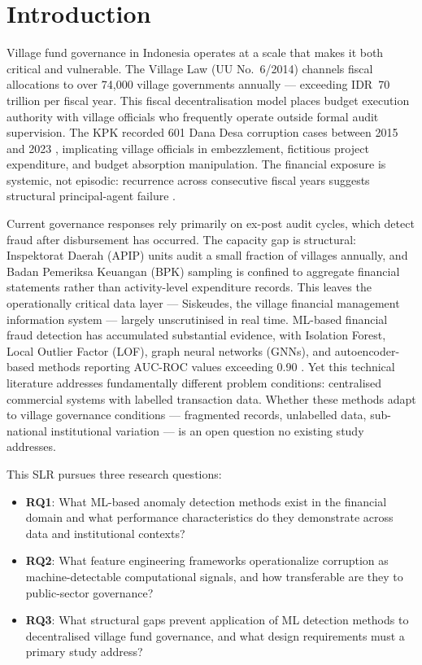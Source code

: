 \documentclass[3p,times,procedia]{elsarticle}
\begin{document}
\vspace*{-6pt}

\section{Introduction}
\label{sec:intro}

Village fund governance in Indonesia operates at a scale that makes it both critical and vulnerable. The Village Law (UU No.~6/2014) channels fiscal allocations to over 74,000 village governments annually --- exceeding IDR~70 trillion per fiscal year. This fiscal decentralisation model places budget execution authority with village officials who frequently operate outside formal audit supervision. The KPK recorded 601 Dana Desa corruption cases between 2015 and 2023 \cite{method_kpk2023}, implicating village officials in embezzlement, fictitious project expenditure, and budget absorption manipulation. The financial exposure is systemic, not episodic: recurrence across consecutive fiscal years suggests structural principal-agent failure \cite{method_jensen1976}.

Current governance responses rely primarily on ex-post audit cycles, which detect fraud after disbursement has occurred. The capacity gap is structural: Inspektorat Daerah (APIP) units audit a small fraction of villages annually, and Badan Pemeriksa Keuangan (BPK) sampling is confined to aggregate financial statements rather than activity-level expenditure records. This leaves the operationally critical data layer --- Siskeudes, the village financial management information system --- largely unscrutinised in real time. ML-based financial fraud detection has accumulated substantial evidence, with Isolation Forest, Local Outlier Factor (LOF), graph neural networks (GNNs), and autoencoder-based methods reporting AUC-ROC values exceeding 0.90 \cite{p003,p007,p015,p022,p026,p041,p043}. Yet this technical literature addresses fundamentally different problem conditions: centralised commercial systems with labelled transaction data. Whether these methods adapt to village governance conditions --- fragmented records, unlabelled data, sub-national institutional variation --- is an open question no existing study addresses.

This SLR pursues three research questions:
\begin{itemize}
\item \textbf{RQ1}: What ML-based anomaly detection methods exist in the financial domain and what performance characteristics do they demonstrate across data and institutional contexts?
\item \textbf{RQ2}: What feature engineering frameworks operationalize corruption as machine-detectable computational signals, and how transferable are they to public-sector governance?
\item \textbf{RQ3}: What structural gaps prevent application of ML detection methods to decentralised village fund governance, and what design requirements must a primary study address?
\end{itemize}
\end{document}

